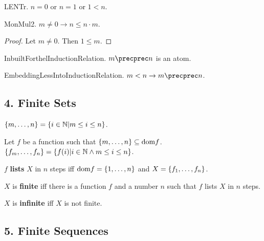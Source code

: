 \begin{axiom} LENTr. 
$n = 0$ or $n = 1$ or $1 < n$.\end{axiom}


\begin{lemma} MonMul2. $m \neq 0 \rightarrow n \leq n \cdot m$.
\end{lemma}
\begin{proof}
Let $m \neq 0$. Then $1 \leq m$.
\end{proof}

\begin{signature} InbuiltForthelInductionRelation. $m \precprec n$ is an atom.
\end{signature}

\begin{axiom} EmbeddingLessIntoInductionRelation. $m < n \rightarrow m \precprec n$. \end{axiom}

\subsection{4. Finite Sets}

\begin{definitionp} 
$\{m,\dots,n\} = \{ i \in {\Bbb N} | m \leq i \leq n \}$.
\end{definitionp}

\begin{definitionp} 
Let $f$ be a function such that 
$\{m,\dots,n\} \subseteq \text{dom} f$. 
$\{f_{m},\dots,f_{n}\} = \{ f(i) | i \in {\Bbb N} \wedge m \leq i \leq n \}$.
\end{definitionp}

\begin{definitionp} $f$ {\bf lists} $X$ in $n$ steps iff 
$\text{dom} f = \{1,\dots,n\}$ and $X = \{f_{1},\dots,f_{n}\}$.
\end{definitionp}

\begin{definitionp} $X$ is {\bf finite} iff there is a function
$f$ and a number $n$ such that $f$ lists $X$ in $n$ steps.
\end{definitionp}

\begin{definitionp} $X$ is {\bf infinite} iff $X$ is not finite.
\end{definitionp}

\subsection{5. Finite Sequences}

